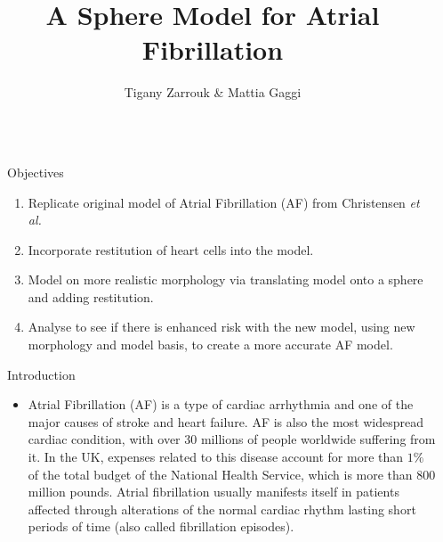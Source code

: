 \documentclass[final,hyperref={pdfpagelabels=false}]{beamer}
\title{\huge A Sphere Model for Atrial Fibrillation} %
\author{Tigany Zarrouk \& Mattia Gaggi } %
\institute{Supervisor: Kim Christensen.  Condensed Matter Theory Group---Imperial College London} %
\begin{document}

\begin{frame}[t] %

\begin{columns}[t] %

\begin{column}{.02\textwidth}\end{column} %

\begin{column}{.465\textwidth} %


\begin{block}{Objectives}

\begin{enumerate}
\item Replicate original model of Atrial Fibrillation (AF) from Christensen \emph{et al.}
\item Incorporate restitution of heart cells into the model. 
\item Model on more realistic morphology via translating model onto a sphere and adding restitution. 
\item Analyse to see if there is enhanced risk with the new model, using new morphology and model basis, to create a more accurate AF model.
\end{enumerate}

\end{block}

            
\begin{block}{Introduction}

\begin{itemize}
\item Atrial Fibrillation (AF) is a type of cardiac arrhythmia and one of the major causes of stroke and heart failure. AF is also the most widespread cardiac condition, with over 30 millions of people worldwide suffering from it. In the UK, expenses related to this disease account for more than $1\%$ of the total budget of the National Health Service, which is more than $800$ million pounds. Atrial fibrillation usually manifests itself in patients affected through alterations of the normal cardiac rhythm lasting short periods of time (also called fibrillation episodes).\\
\end{itemize}



\end{block}
\end{column}
\end{columns}
\end{frame}
\end{document}

